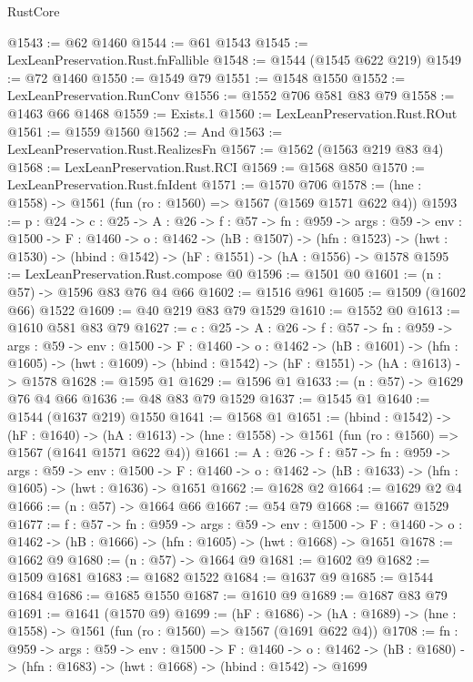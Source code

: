 \begin{lexlean}{RustCore}
\begin{coremodule}
@1543 := @62 @1460
@1544 := @61 @1543
@1545 := LexLeanPreservation.Rust.fnFallible
@1548 := @1544 (@1545 @622 @219)
@1549 := @72 @1460
@1550 := @1549 @79
@1551 := @1548 @1550
@1552 := LexLeanPreservation.RunConv
@1556 := @1552 @706 @581 @83 @79
@1558 := @1463 @66 @1468
@1559 := Exists.{1}
@1560 := LexLeanPreservation.Rust.ROut
@1561 := @1559 @1560
@1562 := And
@1563 := LexLeanPreservation.Rust.RealizesFn
@1567 := @1562 (@1563 @219 @83 @4)
@1568 := LexLeanPreservation.Rust.RCI
@1569 := @1568 @850
@1570 := LexLeanPreservation.Rust.fnIdent
@1571 := @1570 @706
@1578 := (hne : @1558) -> @1561 (fun (ro : @1560) => @1567 (@1569 @1571 @622 @4))
@1593 := {p : @24} ->
  {c : @25} ->
  {A : @26} ->
  {f : @57} ->
  {fn : @959} ->
  {args : @59} ->
  {env : @1500} ->
  {F : @1460} ->
  {o : @1462} ->
  (hB : @1507) ->
  (hfn : @1523) -> (hwt : @1530) -> (hbind : @1542) -> (hF : @1551) -> (hA : @1556) -> @1578
@1595 := LexLeanPreservation.Rust.compose @0
@1596 := @1501 @0
@1601 := (n : @57) -> @1596 @83 @76 @4 @66
@1602 := @1516 @961
@1605 := @1509 (@1602 @66) @1522
@1609 := @40 @219 @83 @79 @1529
@1610 := @1552 @0
@1613 := @1610 @581 @83 @79
@1627 := {c : @25} ->
  {A : @26} ->
  {f : @57} ->
  {fn : @959} ->
  {args : @59} ->
  {env : @1500} ->
  {F : @1460} ->
  {o : @1462} ->
  (hB : @1601) ->
  (hfn : @1605) -> (hwt : @1609) -> (hbind : @1542) -> (hF : @1551) -> (hA : @1613) -> @1578
@1628 := @1595 @1
@1629 := @1596 @1
@1633 := (n : @57) -> @1629 @76 @4 @66
@1636 := @48 @83 @79 @1529
@1637 := @1545 @1
@1640 := @1544 (@1637 @219) @1550
@1641 := @1568 @1
@1651 := (hbind : @1542) ->
  (hF : @1640) ->
  (hA : @1613) -> (hne : @1558) -> @1561 (fun (ro : @1560) => @1567 (@1641 @1571 @622 @4))
@1661 := {A : @26} ->
  {f : @57} ->
  {fn : @959} ->
  {args : @59} ->
  {env : @1500} ->
  {F : @1460} -> {o : @1462} -> (hB : @1633) -> (hfn : @1605) -> (hwt : @1636) -> @1651
@1662 := @1628 @2
@1664 := @1629 @2 @4
@1666 := (n : @57) -> @1664 @66
@1667 := @54 @79
@1668 := @1667 @1529
@1677 := {f : @57} ->
  {fn : @959} ->
  {args : @59} ->
  {env : @1500} ->
  {F : @1460} -> {o : @1462} -> (hB : @1666) -> (hfn : @1605) -> (hwt : @1668) -> @1651
@1678 := @1662 @9
@1680 := (n : @57) -> @1664 @9
@1681 := @1602 @9
@1682 := @1509 @1681
@1683 := @1682 @1522
@1684 := @1637 @9
@1685 := @1544 @1684
@1686 := @1685 @1550
@1687 := @1610 @9
@1689 := @1687 @83 @79
@1691 := @1641 (@1570 @9)
@1699 := (hF : @1686) ->
  (hA : @1689) -> (hne : @1558) -> @1561 (fun (ro : @1560) => @1567 (@1691 @622 @4))
@1708 := {fn : @959} ->
  {args : @59} ->
  {env : @1500} ->
  {F : @1460} ->
  {o : @1462} -> (hB : @1680) -> (hfn : @1683) -> (hwt : @1668) -> (hbind : @1542) -> @1699

\end{coremodule}
\end{lexlean}
